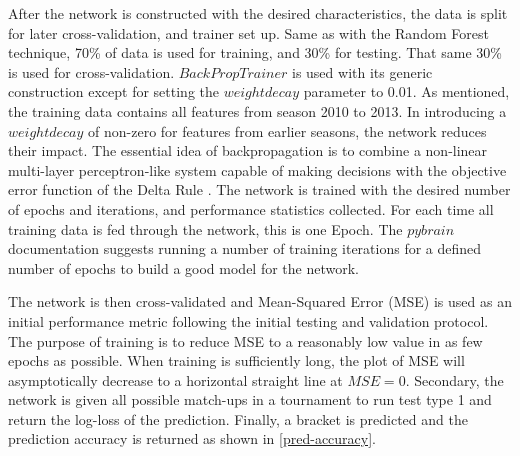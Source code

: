 \documentclass[conference]{IEEEtran}
\begin{document}
{After the network is constructed with the desired characteristics, the data is split for later cross-validation, and trainer set up.
Same as with the Random Forest technique, 70\% of data is used for training, and 30\% for testing. 
That same 30\% is used for cross-validation.
$BackPropTrainer$ is used with its generic construction except for setting the $weightdecay$ parameter to 0.01.
As mentioned, the training data contains all features from season 2010 to 2013.
In introducing a $weightdecay$ of non-zero for features from earlier seasons, the network reduces their impact.
The essential idea of backpropagation is to combine a non-linear multi-layer perceptron-like system capable of making decisions with the objective error function of the Delta Rule \cite{McClelland-1988}.
The network is trained with the desired number of epochs and iterations, and performance statistics collected.
For each time all training data is fed through the network, this is one Epoch.
The $pybrain$ documentation suggests running a number of training iterations for a defined number of epochs to build a good model for the network.

The network is then cross-validated and Mean-Squared Error (MSE) is used as an initial performance metric following the initial testing and validation protocol.
The purpose of training is to reduce MSE to a reasonably low value in as few epochs as possible.
When training is sufficiently long, the plot of MSE will asymptotically decrease to a horizontal straight line at $MSE = 0$.
Secondary, the network is given all possible match-ups in a tournament to run test type 1 and return the log-loss of the prediction.
Finally, a bracket is predicted and the prediction accuracy is returned as shown in \eqref{pred-accuracy}.


}
\end{document}
